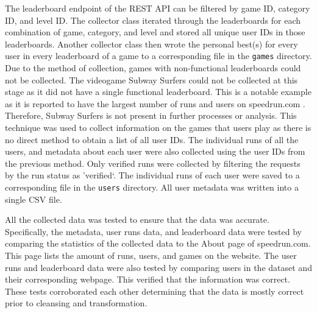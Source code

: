 The leaderboard endpoint of the REST API can be filtered by game ID, category ID, and level ID. The collector class iterated through the leaderboards for each combination of game, category, and level and stored all unique user IDs in those leaderboards. Another collector class then wrote the personal best(s) for every user in every leaderboard of a game to a corresponding file in the \texttt{games} directory. Due to the method of collection, games with non-functional leaderboards could not be collected. The videogame Subway Surfers could not be collected at this stage as it did not have a single functional leaderboard. This is a notable example as it is reported to have the largest number of runs and users on speedrun.com \cite{subway_surfers}. Therefore, Subway Surfers is not present in further processes or analysis. This technique was used to collect information on the games that users play as there is no direct method to obtain a list of all user IDs. The individual runs of all the users, and metadata about each user were also collected using the user IDs from the previous method. Only verified runs were collected by filtering the requests by the run status as 'verified`. The individual runs of each user were saved to a corresponding file in the \texttt{users} directory. All user metadata was written into a single CSV file.


All the collected data was tested to ensure that the data was accurate. Specifically, the metadata, user runs data, and leaderboard data were tested by comparing the statistics of the collected data to the About page of speedrun.com. This page lists the amount of runs, users, and games on the website. The user runs and leaderboard data were also tested by comparing users in the dataset and their corresponding webpage. This verified that the information was correct. These tests corroborated each other determining that the data is mostly correct prior to cleansing and transformation.

